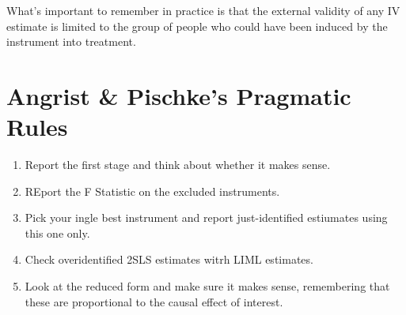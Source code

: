 \documentclass[12 pt]{article}
\begin{document}
What's important to remember in practice is that the external validity
of any IV estimate is limited to the group of people who could have
been induced by the instrument into treatment. 


\section{Angrist \& Pischke's Pragmatic Rules}
\label{sec:angrist--pischkes}

\begin{enumerate}
\item Report the first stage and think about whether it makes sense. 
\item REport the F Statistic on the excluded instruments. 
\item Pick your ingle best instrument and report just-identified
  estiumates using this one only. 
\item Check overidentified 2SLS estimates witrh LIML estimates. 
\item Look at the reduced form and make sure it makes sense,
  remembering that these are proportional to the causal effect of
  interest. 
\end{enumerate}
\end{document}
